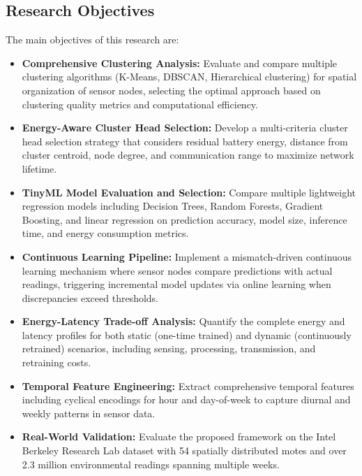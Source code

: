 \documentclass[12pt,a4paper]{article}
\begin{document}
\subsection{Research Objectives}
The main objectives of this research are:
\begin{itemize}
    \item \textbf{Comprehensive Clustering Analysis:} Evaluate and compare multiple clustering algorithms (K-Means, DBSCAN, Hierarchical clustering) for spatial organization of sensor nodes, selecting the optimal approach based on clustering quality metrics and computational efficiency.

    \item \textbf{Energy-Aware Cluster Head Selection:} Develop a multi-criteria cluster head selection strategy that considers residual battery energy, distance from cluster centroid, node degree, and communication range to maximize network lifetime.

    \item \textbf{TinyML Model Evaluation and Selection:} Compare multiple lightweight regression models including Decision Trees, Random Forests, Gradient Boosting, and linear regression on prediction accuracy, model size, inference time, and energy consumption metrics.

    \item \textbf{Continuous Learning Pipeline:} Implement a mismatch-driven continuous learning mechanism where sensor nodes compare predictions with actual readings, triggering incremental model updates via online learning when discrepancies exceed thresholds.

    \item \textbf{Energy-Latency Trade-off Analysis:} Quantify the complete energy and latency profiles for both static (one-time trained) and dynamic (continuously retrained) scenarios, including sensing, processing, transmission, and retraining costs.

    \item \textbf{Temporal Feature Engineering:} Extract comprehensive temporal features including cyclical encodings for hour and day-of-week to capture diurnal and weekly patterns in sensor data.

    \item \textbf{Real-World Validation:} Evaluate the proposed framework on the Intel Berkeley Research Lab dataset with 54 spatially distributed motes and over 2.3 million environmental readings spanning multiple weeks.
\end{itemize}
\end{document}
